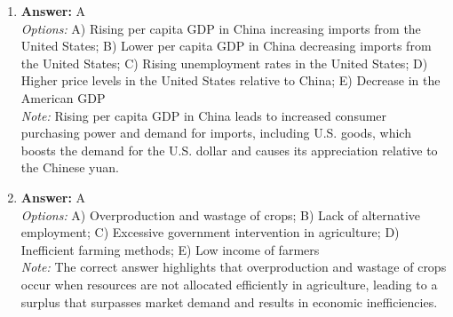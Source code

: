 \documentclass[12pt]{article}
\begin{document}
\begin{enumerate}[label=\arabic*.]
\item \textbf{Answer:} A
\\ \textit{Options:} A) Rising per capita GDP in China increasing imports from the United States; B) Lower per capita GDP in China decreasing imports from the United States; C) Rising unemployment rates in the United States; D) Higher price levels in the United States relative to China; E) Decrease in the American GDP
\\ \textit{Note:} Rising per capita GDP in China leads to increased consumer purchasing power and demand for imports, including U.S. goods, which boosts the demand for the U.S. dollar and causes its appreciation relative to the Chinese yuan.
\item \textbf{Answer:} A
\\ \textit{Options:} A) Overproduction and wastage of crops; B) Lack of alternative employment; C) Excessive government intervention in agriculture; D) Inefficient farming methods; E) Low income of farmers
\\ \textit{Note:} The correct answer highlights that overproduction and wastage of crops occur when resources are not allocated efficiently in agriculture, leading to a surplus that surpasses market demand and results in economic inefficiencies.
\end{enumerate}
\end{document}
